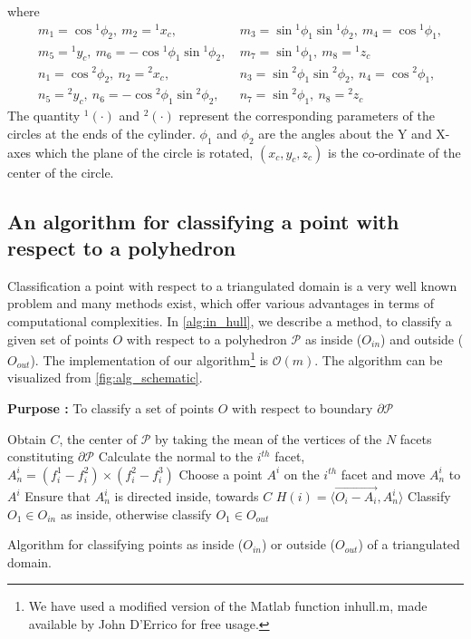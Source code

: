 \documentclass[12pt,a4]{article}
\begin{document}
where
\begin{align*}
&m_1= \cos{}^1\phi_2,~m_2 = {}^1x_c,~&m_3 = \sin{}^1\phi_1\sin{}^1\phi_2,~m_4=\cos{}^1\phi_1, \nonumber \\
&m_5 = {}^1y_c,~m_6=-\cos{}^1\phi_1\sin{}^1\phi_2,~&m_7=\sin{}^1\phi_1,~m_8={}^1z_c \nonumber\\
&n_1 = \cos{}^2\phi_2,~n_2 = {}^2x_c,~&n_3 = \sin{}^2\phi_1\sin{}^2\phi_2,~n_4=\cos{}^2\phi_1, \nonumber \\
&n_5 = {}^2y_c,~n_6=-\cos{}^2\phi_1\sin{}^2\phi_2,~&n_7=\sin{}^2\phi_1,~n_8={}^2z_c \nonumber
\end{align*}
The quantity ${}^1\left(\cdot\right)$ and ${}^2\left(\cdot\right)$ represent the corresponding parameters of the circles at the ends of the cylinder. $\phi_1$ and $\phi_2$ are the angles about the Y and X-axes which the plane of the circle is rotated, $(x_c,y_c,z_c)$ is the co-ordinate of the center of the circle.

\subsection{An algorithm for classifying a point with respect to a polyhedron}\label{app:polyhedron_point}
\indent Classification a point with respect to a triangulated domain is a very well known problem and many methods exist, which offer various advantages in terms of computational complexities. In \cref{alg:in_hull}, we describe a method, to classify a given set of points $O$ with respect to a polyhedron $\mathcal{P}$ as inside ($O_{in}$) and outside ($O_{out}$). The implementation of our algorithm\footnote{We have used a modified version of the Matlab function inhull.m, made available by John D'Errico for free usage. } is $\mathcal{O}(m)$. The algorithm can be visualized from \cref{fig:alg_schematic}.
\begin{algorithm}[ht!]
	\textbf{Purpose :} To classify a set of points $ O $ with respect to  boundary $\partial \mathcal{P}$\\
	\begin{algorithmic}[1]
		\STATE Obtain $C$, the center of $\mathcal{P}$ by taking the mean of the vertices of the $N$ facets constituting $\partial \mathcal{P}$
		\STATE Calculate the normal to the $i^{th}$ facet, $A_n^i=(f_i^1-f_i^2)\times(f_i^2-f_i^3)$
		\STATE Choose a point $A^i$ on the $i^{th}$ facet and move $A_n^i$ to $A^i$
		\STATE Ensure that $A_n^i$ is directed inside, towards $C$
		\STATE $H(i)=\langle\vec{O_i-A_i}, A_n^i\rangle$
		\ENDFOR 
		\STATE Classify $O_1 \in O_{in}$ as inside, otherwise classify $O_1\in O_{out}$  		
		\ENDIF
	\end{algorithmic}
	
	\caption{Algorithm for classifying points as inside ($O_{in}$) or outside ($O_{out}$) of a triangulated domain. }		
	\label{alg:in_hull}
\end{algorithm}
\end{document}
